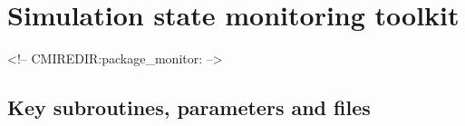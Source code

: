 \section{Simulation state monitoring toolkit}
\label{sec:pkg:monitor}
\begin{rawhtml}
<!-- CMIREDIR:package_monitor: -->
\end{rawhtml}

\subsection{Key subroutines, parameters and files}
\label{sec:pkg:monitor:implementation_synopsis}
